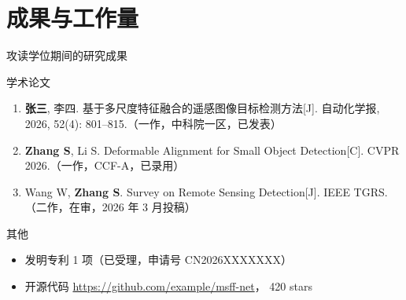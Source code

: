\section{成果与工作量}

\begin{frame}{攻读学位期间的研究成果}
  \begin{block}{学术论文}
    \begin{enumerate}
      \setlength{\itemsep}{0.15em}
      \item \textbf{张三}, 李四. 基于多尺度特征融合的遥感图像目标检测方法[J].
            自动化学报, 2026, 52(4): 801--815.（一作，中科院一区，\alert{已发表}）
      \item \textbf{Zhang S}, Li S. Deformable Alignment for Small Object
            Detection[C]. CVPR 2026.（一作，CCF-A，\alert{已录用}）
      \item Wang W, \textbf{Zhang S}. Survey on Remote Sensing Detection[J].
            IEEE TGRS.（二作，\alert{在审，2026 年 3 月投稿}）
    \end{enumerate}
  \end{block}

  \begin{block}{其他}
    \begin{itemize}
      \item 发明专利 1 项（已受理，申请号 CN2026XXXXXXX）
      \item 开源代码 \url{https://github.com/example/msff-net}，
            \num{420} stars
    \end{itemize}
  \end{block}

\end{frame}
